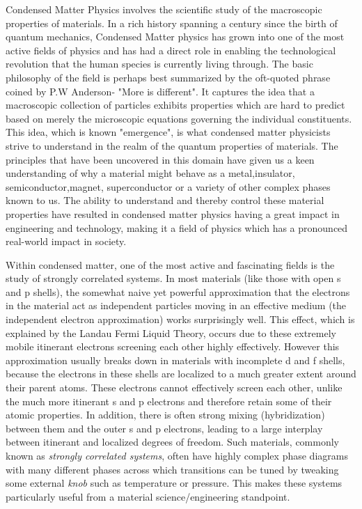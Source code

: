 \documentclass[10pt]{ruthesis}
\begin{document}
Condensed Matter Physics involves the scientific study of the macroscopic properties of materials. In a rich history spanning a century since the birth of quantum mechanics, Condensed Matter physics has grown into one of the most active fields of physics and has had a direct role in enabling the technological revolution that the human species is currently living through. The basic philosophy of the field is perhaps best summarized by the oft-quoted phrase coined by P.W Anderson- "More is different". It captures the idea that a macroscopic collection of particles exhibits properties which are hard to predict based on merely the microscopic equations governing the individual constituents. This idea, which is known "emergence", is what condensed matter physicists strive to understand in the realm of the quantum properties of materials. The principles that have been uncovered in this domain have given us a keen understanding of why a material might behave as a metal,insulator, semiconductor,magnet, superconductor or a variety of other complex phases known to us. The ability to understand and thereby control these material properties have resulted in condensed matter physics having a great impact in engineering and technology, making it a field of physics which has a pronounced real-world impact in society.
\linebreak

Within condensed matter, one of the most active and fascinating fields is the study of strongly correlated systems. In most materials (like those with open s and p shells), the somewhat naive yet powerful approximation that the electrons in the material act as independent particles moving in an effective medium (the independent electron approximation) works surprisingly well. This effect, which is explained by the Landau Fermi Liquid Theory, occurs due to these extremely mobile itinerant electrons screening each other highly effectively. However this approximation usually breaks down in materials with incomplete d and f shells, because the electrons in these shells are localized to a much greater extent around their parent atoms. These electrons cannot effectively screen each other, unlike the much more itinerant s and p electrons and therefore retain some of their atomic properties. In addition, there is often strong mixing (hybridization) between them and the outer s and p electrons, leading to a large interplay between itinerant and localized degrees of freedom. Such materials, commonly known as \textit{strongly correlated systems}, often have highly complex phase diagrams with many different phases across which transitions can be tuned by tweaking some external \textit{knob} such as temperature or pressure. This makes these systems particularly useful from a material science/engineering standpoint.
\end{document}
